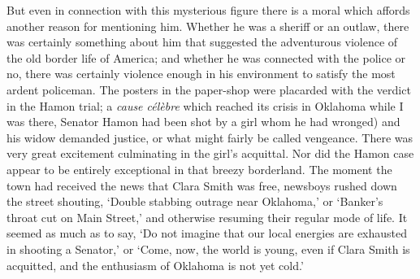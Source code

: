 \documentclass{book}
\begin{document}
But even in connection with this mysterious figure there is a moral which affords another reason for mentioning him. Whether he was a sheriff or an outlaw, there was certainly something about him that suggested the adventurous violence of the old border life of America; and whether he was connected with the police or no, there was certainly violence enough in his environment to satisfy the most ardent policeman. The posters in the paper-shop were placarded with the verdict in the Hamon trial; a \emph{cause célèbre} which reached its crisis in Oklahoma while I was there, Senator Hamon had been shot by a girl whom he had wronged) and his widow demanded justice, or what might fairly be called vengeance. There was very great excitement culminating in the girl’s acquittal. Nor did the Hamon case appear to be entirely exceptional in that breezy borderland. The moment the town had received the news that Clara Smith was free, newsboys rushed down the street shouting, ‘Double stabbing outrage near Oklahoma,’ or ‘Banker’s throat cut on Main Street,’ and otherwise resuming their regular mode of life. It seemed as much as to say, ‘Do not imagine that our local energies are exhausted in shooting a Senator,’ or ‘Come, now, the world is young, even if Clara Smith is acquitted, and the enthusiasm of Oklahoma is not yet cold.’
\end{document}
